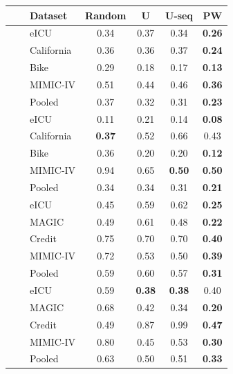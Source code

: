 \begin{tabular}{cclcccc}
\toprule
 & & Dataset & Random & U & U-seq & PW \\
\midrule
{} &  & eICU & 0.34 & 0.37 & 0.34 & \textbf{0.26} \\
 &  & California & 0.36 & 0.36 & 0.37 & \textbf{0.24} \\
 &  & Bike & 0.29 & 0.18 & 0.17 & \textbf{0.13} \\
 &  & MIMIC-IV & 0.51 & 0.44 & 0.46 & \textbf{0.36} \\
\addlinespace[2pt]
 &  & Pooled & 0.37 & 0.32 & 0.31 & \textbf{0.23} \\
\cmidrule(l){2-7}
 &  & eICU & 0.11 & 0.21 & 0.14 & \textbf{0.08} \\
 &  & California & \textbf{0.37} & 0.52 & 0.66 & 0.43 \\
 &  & Bike & 0.36 & 0.20 & 0.20 & \textbf{0.12} \\
 &  & MIMIC-IV & 0.94 & 0.65 & \textbf{0.50} & \textbf{0.50} \\
\addlinespace[2pt]
 &  & Pooled & 0.34 & 0.34 & 0.31 & \textbf{0.21} \\
\midrule
{} &  & eICU & 0.45 & 0.59 & 0.62 & \textbf{0.25} \\
 &  & MAGIC & 0.49 & 0.61 & 0.48 & \textbf{0.22} \\
 &  & Credit & 0.75 & 0.70 & 0.70 & \textbf{0.40} \\
 &  & MIMIC-IV & 0.72 & 0.53 & 0.50 & \textbf{0.39} \\
\addlinespace[2pt]
 &  & Pooled & 0.59 & 0.60 & 0.57 & \textbf{0.31} \\
\cmidrule(l){2-7}
 &  & eICU & 0.59 & \textbf{0.38} & \textbf{0.38} & 0.40 \\
 &  & MAGIC & 0.68 & 0.42 & 0.34 & \textbf{0.20} \\
 &  & Credit & 0.49 & 0.87 & 0.99 & \textbf{0.47} \\
 &  & MIMIC-IV & 0.80 & 0.45 & 0.53 & \textbf{0.30} \\
\addlinespace[2pt]
 &  & Pooled & 0.63 & 0.50 & 0.51 & \textbf{0.33} \\
\bottomrule
\end{tabular}
